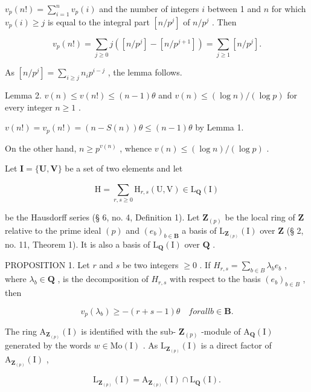 \(v_{p}(n!) = \sum_{i=1}^{n} v_{p}(i)\) and the number of integers \(i\) between 1 and \(n\) for which \(v_{p}(i) \geqslant j\) is equal to the integral part \([n/p^{j}]\) of \(n/p^{j}\) . Then

\[
v _ {p} (n!) = \sum_ {j \geqslant 0} j ([ n / p ^ {j} ] - [ n / p ^ {j + 1} ]) = \sum_ {j \geqslant 1} [ n / p ^ {j} ].
\]

As \([n / p^j] = \sum_{i\geqslant j}n_i p^{i - j}\) , the lemma follows.

Lemma 2. \(v(n) \leqslant v(n!) \leqslant (n - 1)\theta\) and \(v(n) \leqslant (\log n) / (\log p)\) for every integer \(n \geqslant 1\) .

\(v(n!) = v_{p}(n!) = (n - S(n))\theta \leqslant (n - 1)\theta\) by Lemma 1.

On the other hand, \(n \geqslant p^{v(n)}\) , whence \(v(n) \leqslant (\log n) / (\log p)\) .

Let \(\mathbf{I} = \{\mathbf{U},\mathbf{V}\}\) be a set of two elements and let

\[
\mathrm{H} = \sum_ {r, s \geqslant 0} \mathrm{H} _ {r, s} (\mathrm{U}, \mathrm{V}) \in \hat {\mathrm{L}} _ {\mathbf {Q}} (\mathrm{I})
\]

be the Hausdorff series (§ 6, no. 4, Definition 1). Let \(\mathbf{Z}_{(p)}\) be the local ring of \(\mathbf{Z}\) relative to the prime ideal \((p)\) and \((e_b)_{b \in \mathbf{B}}\) a basis of \(\mathrm{L}_{\mathbf{Z}_{(p)}}(\mathrm{I})\) over \(\mathbf{Z}\) (§ 2, no. 11, Theorem 1). It is also a basis of \(\mathrm{L}_{\mathbf{Q}}(\mathrm{I})\) over \(\mathbf{Q}\) .

PROPOSITION 1. Let \(r\) and \(s\) be two integers \(\geqslant 0\) . If \(H_{r,s} = \sum_{b \in B} \lambda_b e_b\) , where \(\lambda_b \in \mathbf{Q}\) , is the decomposition of \(H_{r,s}\) with respect to the basis \((e_b)_{b \in B}\) , then

\[
v _ {p} (\lambda_ {b}) \geqslant - (r + s - 1) \theta \quad for all b \in \mathbf {B}.\tag{4}
\]

The ring \(\mathrm{A}_{\mathbf{Z}_{(p)}}(\mathrm{I})\) is identified with the sub- \(\mathbf{Z}_{(p)}\) -module of \(\mathrm{A}_{\mathbf{Q}}(\mathrm{I})\) generated by the words \(w \in \mathrm{Mo}(\mathrm{I})\) . As \(\mathrm{L}_{\mathbf{Z}_{(p)}}(\mathrm{I})\) is a direct factor of \(\mathrm{A}_{\mathbf{Z}_{(p)}}(\mathrm{I})\) ,

\[
\mathrm{L} _ {\mathbf {Z} _ {(p)}} (\mathrm{I}) = \mathrm{A} _ {\mathbf {Z} _ {(p)}} (\mathrm{I}) \cap \mathrm{L} _ {\mathbf {Q}} (\mathrm{I}).\tag{5}
\]

